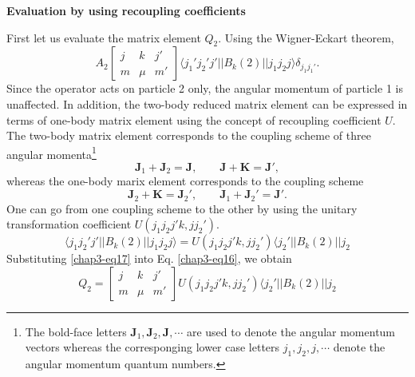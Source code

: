 \medskip
\noindent \textbf{\large Evaluation by using recoupling coefficients}
\medskip

\noindent First let us evaluate the matrix element $Q_2$. Using the Wigner-Eckart theorem,
\begin{equation}
A_2 \begin{bmatrix}j & k & j'\\m & \mu & m'\end{bmatrix}
\langle j_1' j_2' j' || B_k (2) || j_1 j_2 j \rangle \delta_{j_1 j_1'}. \label{chap3-eq16}
\end{equation}
Since the operator acts on particle 2 only, the angular momentum of particle 1 is unaffected. In addition, the two-body reduced matrix element can be expressed in terms of one-body matrix element using the concept of recoupling coefficient $U$. The two-body matrix element corresponds to the coupling scheme of three angular momenta\footnote{The bold-face letters $\mathbf{J}_1, \mathbf{J}_2, \mathbf{J}, \cdots$ are used to denote the angular momentum vectors whereas the corresponging lower case letters $j_1, j_2, j, \cdots$ denote the angular momentum quantum numbers.}
$$
\mathbf{J}_1 + \mathbf{J}_2 = \mathbf{J}, \qquad \mathbf{J}+ \mathbf{K}= \mathbf{J}',
$$
whereas the one-body marix element corresponds to the coupling scheme
$$
\mathbf{J}_2 + \mathbf{K} = \mathbf{J}_2', \qquad \mathbf{J}_1+ \mathbf{J}_2'= \mathbf{J}'.
$$
One can go from one coupling scheme to the other by using the unitary transformation coefficient $U(j_1 j_2 j' k, j j_2')$.
\begin{equation}
\langle j_1 j_2' j' || B_k (2) || j_1 j_2 j \rangle = U (j_1 j_2 j' k, j j_2') \langle j_2' || B_k (2) || j_2 \label{chap3-eq17}
\end{equation}
Substituting \eqref{chap3-eq17} into Eq. \eqref{chap3-eq16}, we obtain
\begin{equation}
Q_2 = \begin{bmatrix}j & k & j'\\m & \mu & m'\end{bmatrix}
U (j_1 j_2 j' k, j j_2') \langle j_2' || B_k (2) || j_2 \label{chap3-eq18}
\end{equation}

